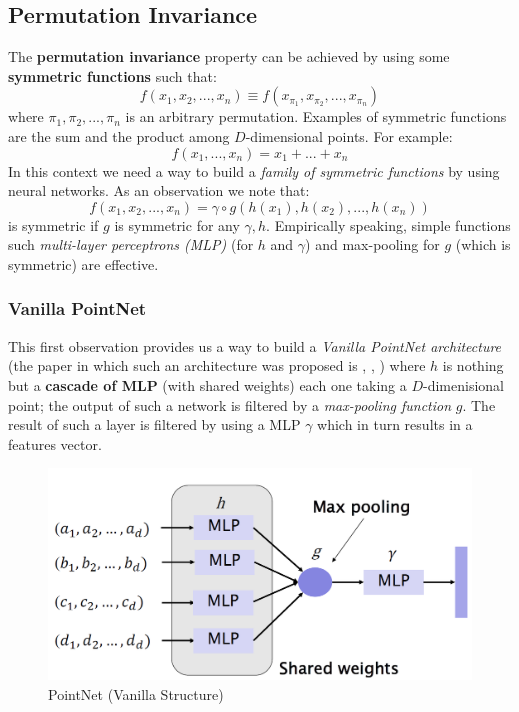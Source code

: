 \subsection{Permutation Invariance}
The \textbf{permutation invariance} property can be achieved by using some \textbf{symmetric functions} such that:
\begin{equation}
    f(x_1,x_2,...,x_n) \equiv f(x_{\pi_1}, x_{\pi_2}, ..., x_{\pi_n})
\end{equation}
where $\pi_1,\pi_2,...,\pi_n$ is an arbitrary permutation. Examples of symmetric functions are the sum and the product among $D$-dimensional points. For example:
\begin{equation*}
    f(x_1,...,x_n)=x_1+...+x_n
\end{equation*}
In this context we need a way to build a \textit{family of symmetric functions} by using neural networks. As an observation we note that:
\begin{equation}
    f(x_1, x_2,...,x_n)=\gamma \circ g(h(x_1),h(x_2),...,h(x_n)) 
\end{equation}
is symmetric if $g$ is symmetric for any $\gamma, h$. Empirically speaking, simple functions such \textit{multi-layer perceptrons (MLP)} (for $h$ and $\gamma$) and max-pooling for $g$ (which is symmetric) are effective.
\subsubsection{Vanilla PointNet}
This first observation provides us a way to build a \textit{Vanilla PointNet architecture} (the paper in which such an architecture was proposed is , \citeauthor{qi2017pointnet}, \cite{qi2017pointnet}) where $h$ is nothing but a \textbf{cascade of MLP} (with shared weights) each one taking a $D$-dimenisional point; the output of such a network is filtered by a \textit{max-pooling function} $g$. The result of such a layer is filtered by using a MLP $\gamma$ which in turn results in a features vector.

\begin{figure}
    \centering
    \includegraphics[scale=0.55]{img/VanillaPointNEt.png}
    \caption{PointNet (Vanilla Structure)}
\end{figure}


